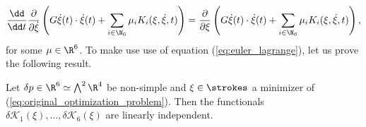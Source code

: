 \begin{align}
\label{eq:euler_lagrange}
\frac{\dd}{\dd t} \frac{\partial}{\partial \dot{\xi}} \left ( G \dot{\xi}(t) \cdot \dot{\xi}(t) + \sum_{i \in \N_6} \mu_i K_i(\xi, \dot{\xi}, t)\right ) = \frac{\partial}{\partial \xi} \left ( G \dot{\xi}(t) \cdot \dot{\xi}(t) + \sum_{i \in \N_6} \mu_i K_i(\xi, \dot{\xi}, t)\right ),
\end{align}
for some $\mu \in \R^6$. To make use use of equation (\ref{eq:euler_lagrange}), let us prove the following result.

\begin{proposition}
\label{prop:linearly_independent_constraints}
Let $\delta p \in \R^6 \simeq \bigwedge^2 \R^4$ be non-simple and $\xi \in \strokes$ a minimizer of (\ref{eq:original_optimization_problem}). Then the functionals $\delta \mathcal{K}_1(\xi), \dotsc, \delta \mathcal{K}_6(\xi)$ are linearly independent.
\end{proposition}

